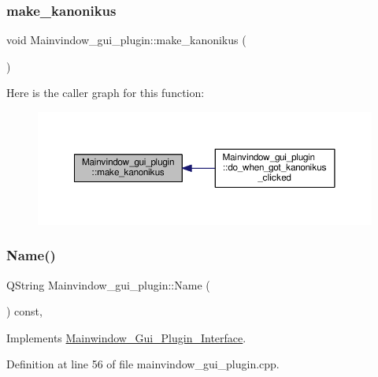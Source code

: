 \subsubsection{\texorpdfstring{make\+\_\+kanonikus}{make\_kanonikus}}
{\footnotesize\ttfamily void Mainvindow\+\_\+gui\+\_\+plugin\+::make\+\_\+kanonikus (\begin{DoxyParamCaption}{ }\end{DoxyParamCaption})\hspace{0.3cm}{\ttfamily [signal]}}

Here is the caller graph for this function\+:\nopagebreak
\begin{figure}[H]
\begin{center}
\leavevmode
\includegraphics[width=350pt]{classMainvindow__gui__plugin_ab72edb0176103371d01ede7a001746a4_icgraph}
\end{center}
\end{figure}
\mbox{\label{classMainvindow__gui__plugin_affd8ce27d7e94a2adac287bc8dd835e0}} 
\subsubsection{\texorpdfstring{Name()}{Name()}}
{\footnotesize\ttfamily Q\+String Mainvindow\+\_\+gui\+\_\+plugin\+::\+Name (\begin{DoxyParamCaption}{ }\end{DoxyParamCaption}) const\hspace{0.3cm}{\ttfamily [override]}, {\ttfamily [virtual]}}



Implements \hyperlink{classMainwindow__Gui__Plugin__Interface_a5cbc7bb0e3bb477472b91f65e916db8e}{Mainwindow\+\_\+\+Gui\+\_\+\+Plugin\+\_\+\+Interface}.



Definition at line 56 of file mainvindow\+\_\+gui\+\_\+plugin.\+cpp.

